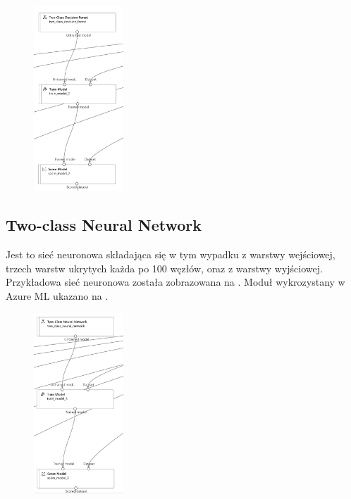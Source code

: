 \begin{figure}[H]
    \centering
    \includegraphics[width=0.3\textwidth]{images/df_pipe}
    \label{fig:df-pipe}
\end{figure}



\subsection{Two-class Neural Network}
Jest to sieć neuronowa składająca się w tym wypadku z warstwy wejściowej, trzech warstw ukrytych każda po 100 węzłów, oraz z warstwy wyjściowej. Przykładowa sieć neuronowa została zobrazowana na . Moduł wykrozystany w Azure ML ukazano na .

\begin{figure}[H]
    \centering
    \includegraphics[width=0.3\textwidth]{images/nn_pipe}
    \label{fig:nn-pipe}
\end{figure}

